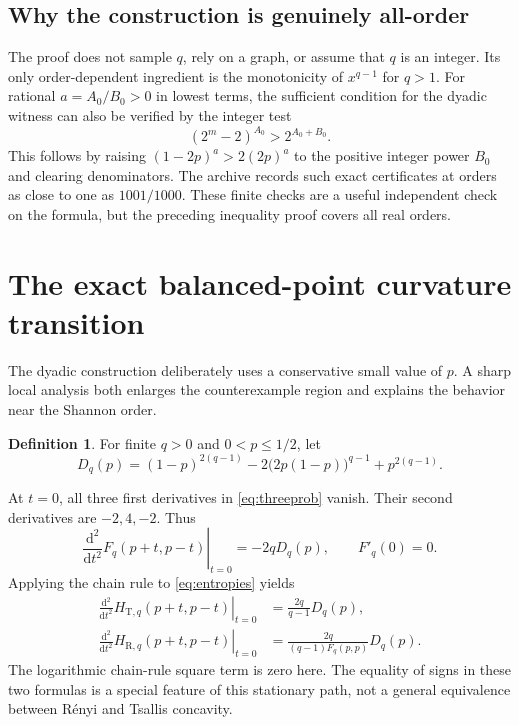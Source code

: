 \documentclass[11pt]{article}
\numberwithin{equation}{section}
\theoremstyle{definition}
\newtheorem{definition}[theorem]{Definition}
\theoremstyle{remark}
\begin{document}
\subsection{Why the construction is genuinely all-order}
The proof does not sample $q$, rely on a graph, or assume that $q$ is an
integer. Its only order-dependent ingredient is the monotonicity of $x^{q-1}$
for $q>1$. For rational $a=A_0/B_0>0$ in lowest terms, the sufficient
condition for the dyadic witness can also be verified by the integer test
\begin{equation}
 (2^m-2)^{A_0}>2^{A_0+B_0}.\label{eq:integercertificate}
\end{equation}
This follows by raising $(1-2p)^a>2(2p)^a$ to the positive integer power
$B_0$ and clearing denominators. The archive records such exact certificates
at orders as close to one as $1001/1000$. These finite checks are a useful
independent check on the formula, but the preceding inequality proof covers
all real orders.

\section{The exact balanced-point curvature transition}
The dyadic construction deliberately uses a conservative small value of $p$.
A sharp local analysis both enlarges the counterexample region and explains
the behavior near the Shannon order.

\begin{definition}
For finite $q>0$ and $0<p\leq1/2$, let
\begin{equation}
 D_q(p)=(1-p)^{2(q-1)}-2\bigl(2p(1-p)\bigr)^{q-1}
             +p^{2(q-1)}.\label{eq:D}
\end{equation}
\end{definition}
At $t=0$, all three first derivatives in \eqref{eq:threeprob} vanish.
Their second derivatives are $-2,4,-2$. Thus
\begin{equation}
 \left.\frac{\mathrm d^2}{\mathrm dt^2}F_q(p+t,p-t)\right|_{t=0}
 =-2qD_q(p),\qquad F'_q(0)=0.\label{eq:Fcurvature}
\end{equation}
Applying the chain rule to \eqref{eq:entropies} yields
\begin{align}
 \left.\frac{\mathrm d^2}{\mathrm dt^2}H_{\mathrm T,q}(p+t,p-t)\right|_{t=0}
 &=\frac{2q}{q-1}D_q(p),\label{eq:Tcurvature}\\
 \left.\frac{\mathrm d^2}{\mathrm dt^2}H_{\mathrm R,q}(p+t,p-t)\right|_{t=0}
 &=\frac{2q}{(q-1)F_q(p,p)}D_q(p).\label{eq:Rcurvature}
\end{align}
The logarithmic chain-rule square term is zero here. The equality of signs
in these two formulas is a special feature of this stationary path, not a
general equivalence between R\'enyi and Tsallis concavity.
\end{document}
